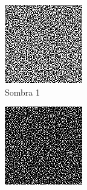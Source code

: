 \begin{figure}[Hp]
	\centering
	\begin{subfigure}[t]{0.3\textwidth}
		\centering
		\includegraphics[width=\textwidth]{images/shade00}
		\caption{Sombra 1}
	\end{subfigure}
	\hspace{0.5cm}
	\begin{subfigure}[t]{0.3\textwidth}
		\centering
		\includegraphics[width=\textwidth]{images/shade0y1}

\end{subfigure}
\end{figure}
